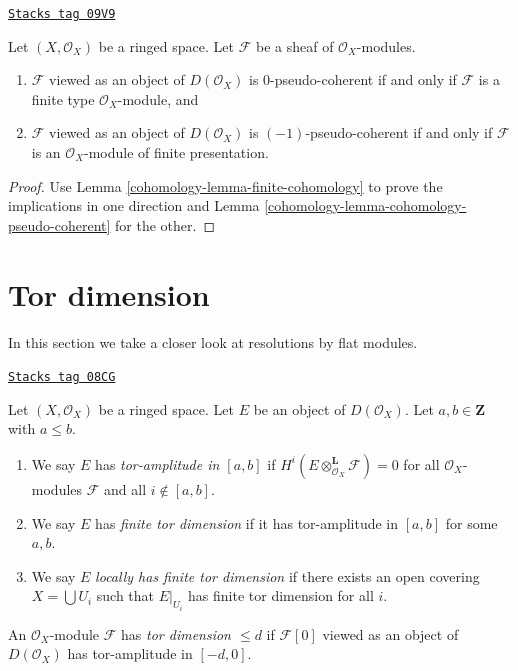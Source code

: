 \begin{lemma}
\label{cohomology-lemma-n-pseudo-module}
\href{https://stacks.math.columbia.edu/tag/09V9}{\texttt{Stacks tag 09V9}}

Let $(X, \mathcal{O}_X)$ be a ringed space. Let $\mathcal{F}$ be a sheaf
of $\mathcal{O}_X$-modules.
\begin{enumerate}
\item $\mathcal{F}$ viewed as an object of $D(\mathcal{O}_X)$ is
$0$-pseudo-coherent if and only if $\mathcal{F}$ is a finite type
$\mathcal{O}_X$-module, and
\item $\mathcal{F}$ viewed as an object of $D(\mathcal{O}_X)$ is
$(-1)$-pseudo-coherent if and only if $\mathcal{F}$ is an
$\mathcal{O}_X$-module of finite presentation.
\end{enumerate}
\end{lemma}

\begin{proof}

Use Lemma \ref{cohomology-lemma-finite-cohomology}
to prove the implications in one direction and
Lemma \ref{cohomology-lemma-cohomology-pseudo-coherent} for the other.
\end{proof}

\section{Tor dimension}
\label{cohomology-section-tor}
In this section we take a closer look at resolutions by flat modules.

\begin{definition}
\label{cohomology-definition-tor-amplitude}
\href{https://stacks.math.columbia.edu/tag/08CG}{\texttt{Stacks tag 08CG}}

Let $(X, \mathcal{O}_X)$ be a ringed space.
Let $E$ be an object of $D(\mathcal{O}_X)$.
Let $a, b \in \mathbf{Z}$ with $a \leq b$.
\begin{enumerate}
\item We say $E$ has {\it tor-amplitude in $[a, b]$}
if $H^i(E \otimes_{\mathcal{O}_X}^\mathbf{L} \mathcal{F}) = 0$
for all $\mathcal{O}_X$-modules $\mathcal{F}$ and all $i \not \in [a, b]$.
\item We say $E$ has {\it finite tor dimension}
if it has tor-amplitude in $[a, b]$ for some $a, b$.
\item We say $E$ {\it locally has finite tor dimension}
if there exists an open covering $X = \bigcup U_i$ such that
$E|_{U_i}$ has finite tor dimension for all $i$.
\end{enumerate}
An $\mathcal{O}_X$-module $\mathcal{F}$ has {\it tor dimension $\leq d$}
if $\mathcal{F}[0]$ viewed as an object of $D(\mathcal{O}_X)$ has
tor-amplitude in $[-d, 0]$.
\end{definition}

